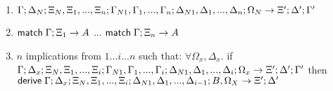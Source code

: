 \begin{theorem}
   \begin{enumerate}
      \item $\do \Gamma; \Delta_N; \Xi_N, \Xi_1, ..., \Xi_n; \Gamma_{N1}, \Gamma_1, ..., \Gamma_n; \Delta_{N1}, \Delta_1, ..., \Delta_n; \Omega_N \rightarrow \Xi'; \Delta'; \Gamma'$
      \item $\mathsf{match} \; \Gamma; \Xi_1 \rightarrow A$ ... $\mathsf{match} \; \Gamma; \Xi_n \rightarrow A$
      \item $n$ implications from $1...i...n$ such that: $\forall \Omega_x, \Delta_x.$ if $\do \Gamma; \Delta_x; \Xi_N, \Xi_1, ..., \Xi_i; \Gamma_{N1}, \Gamma_1, ..., \Gamma_i; \Delta_{N1}, \Delta_1, ..., \Delta_i; \Omega_x \rightarrow \Xi'; \Delta'; \Gamma'$ then $\mathsf{derive} \; \Gamma; \Delta_x; \Xi_N, \Xi_1, ..., \Xi_i; \Delta_{N1}, \Delta_1, ..., \Delta_{i-1}; B, \Omega_X \rightarrow \Xi'; \Delta'$
   \end{enumerate}
\end{theorem}

